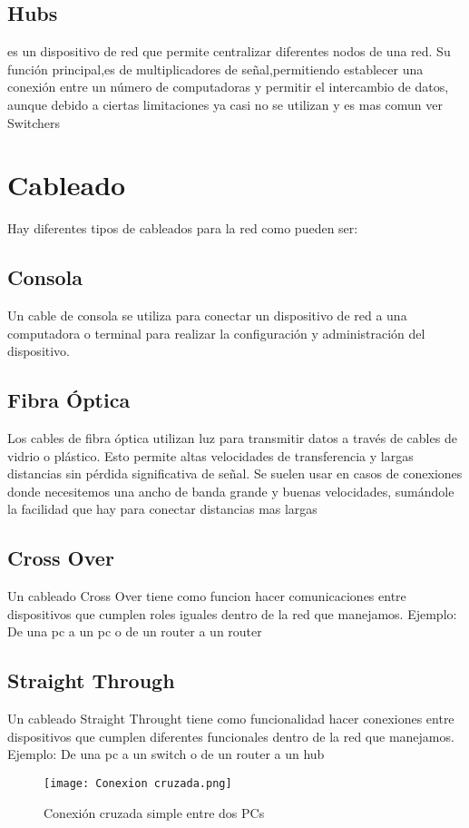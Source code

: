 \documentclass{article}
\begin{document}
\subsection{Hubs}
es un dispositivo de red que permite centralizar diferentes nodos de una red. Su función principal,es de multiplicadores de señal,permitiendo establecer una conexión entre un número de computadoras y permitir el intercambio de datos, aunque debido a ciertas limitaciones ya casi no se utilizan y es mas comun ver Switchers

\section{Cableado}
Hay diferentes tipos de cableados para la red como pueden ser:
\subsection{Consola}
Un cable de consola se utiliza para conectar un dispositivo de red  a una computadora o terminal para realizar la configuración y administración del dispositivo.
\subsection{Fibra Óptica}
Los cables de fibra óptica utilizan luz para transmitir datos a través de cables de vidrio o plástico. Esto permite altas velocidades de transferencia y largas distancias sin pérdida significativa de señal. Se suelen usar en casos de conexiones donde necesitemos una ancho de banda grande y buenas velocidades, sumándole la facilidad que hay para conectar distancias mas largas
\subsection{Cross Over}
Un cableado Cross Over tiene como funcion hacer comunicaciones entre dispositivos que cumplen roles iguales dentro de la red que manejamos. Ejemplo: De una pc a un pc o de un router a un router
\subsection{Straight Through}
Un cableado Straight Throught tiene como funcionalidad hacer conexiones entre dispositivos que cumplen diferentes funcionales dentro de la red que manejamos. Ejemplo: De una pc a un switch o de un router a un hub

\begin{figure}[h]
\centering
\texttt{[image: Conexion cruzada.png]}
\caption{Conexión cruzada simple entre dos PCs}
\label{}
\end{figure}
\end{document}
